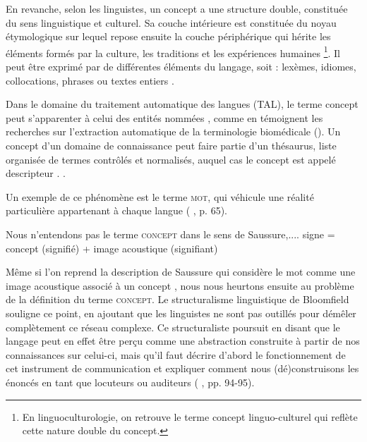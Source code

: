 


En revanche, selon les linguistes, un concept a une structure double, constituée du sens linguistique et culturel.
Sa couche intérieure est constituée du noyau étymologique sur lequel repose ensuite la couche périphérique qui hérite les éléments formés par la culture, les traditions et les expériences humaines
\footnote{En linguoculturologie, on retrouve le terme \og{}concept linguo-culturel\fg{} qui reflète cette nature double du concept.}. Il peut être exprimé par de différentes éléments du langage, soit : lexèmes, idiomes, collocations, phrases ou textes entiers \citep[p.~5]{nemickiene2011concept}. 

Dans le domaine du traitement automatique des langues (\textsc{TAL}), le terme \og concept \fg{} peut s'apparenter à celui des \og entités nommées \fg{}, comme en témoignent les recherches sur l'extraction automatique de la terminologie biomédicale (\citealp{jolly2024exploring,navarro2023clinical}). Un concept d'un domaine de connaissance peut faire partie d'un thésaurus, liste organisée de termes contrôlés et normalisés, auquel cas le concept est appelé \og descripteur \fg{}. \citep[p.~16]{RENNESSON202015}.

Un exemple de ce phénomène est le terme \textsc{mot}, qui véhicule une réalité particulière appartenant à chaque langue (\citeauthor{mounin1968clefs} \citeyear{mounin1968clefs}, p. 65). 

Nous n'entendons pas le terme \textsc{concept} dans le sens de Saussure,.... signe = concept (signifié) + image acoustique (signifiant)

Même si l'on reprend la description de Saussure qui considère le mot comme \og une image acoustique associé à un concept \fg{}, nous nous heurtons ensuite au problème de la définition du terme \textsc{concept}. Le structuralisme linguistique de Bloomfield souligne ce point, en ajoutant que les linguistes ne sont pas outillés pour démêler complètement ce réseau complexe. Ce structuraliste poursuit en disant que le langage peut en effet être perçu comme une abstraction construite à partir de nos connaissances sur celui-ci, mais qu'il faut \og décrire d'abord le fonctionnement de cet instrument de communication \fg{} et expliquer comment nous (dé)construisons les énoncés en tant que locuteurs ou auditeurs (\citeauthor{mounin1968clefs} \citeyear{mounin1968clefs}, pp. 94-95).

